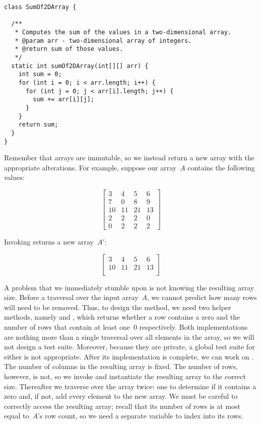 \begin{lstlisting}[language=MyJava]
class SumOf2DArray {

  /**
   * Computes the sum of the values in a two-dimensional array.
   * @param arr - two-dimensional array of integers.
   * @return sum of those values.
   */
  static int sumOf2DArray(int[][] arr) {
    int sum = 0;
    for (int i = 0; i < arr.length; i++) {
      for (int j = 0; j < arr[i].length; j++) {
        sum += arr[i][j];
      }
    }
    return sum;
  }
}
\end{lstlisting}

Remember that arrays are immutable, so we instead return a new array with the appropriate alterations.
For example, suppose our array~$A$ contains the following values:

\[
\begin{bmatrix}
  3&4&5&6\\
  7&0&8&9\\
  10&11&21&13\\
  2&2&2&0\\
  0&2&2&2
\end{bmatrix}
\]

\enlargethispage{-4\baselineskip}
\noindent{}Invoking  returns a new array~$A'$:

\[
\begin{bmatrix}
  3&4&5&6\\
  10&11&21&13\\
\end{bmatrix}
\]

A problem that we immediately stumble upon is not knowing the resulting array size.
Before a traversal over the input array~$A$, we cannot predict how many rows will need to be removed.
Thus, to design the  method, we need two helper methods, namely  and , which returns whether a row contains a zero and the number of rows that contain at least one~$0$ respectively.
Both implementations are nothing more than a single traversal over all elements in the array, so we will not design a test suite.
Moreover, because they are private, a global test suite for either is not appropriate.
After its implementation is complete, we can work on . 
The number of columns in the resulting array is fixed.
The number of rows, however, is not, so we invoke  and instantiate the resulting array to the correct size.
Thereafter we traverse over the array twice: one to determine if it contains a zero and, if not, add every element to the new array.
We must be careful to correctly access the resulting array; recall that its number of rows is at most equal to~$A$'s row count, so we need a separate variable to index into its rows.


